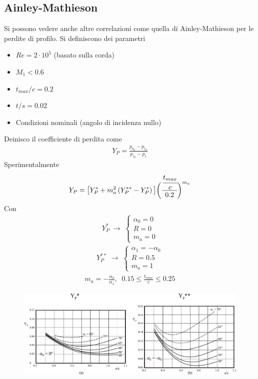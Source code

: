 \subsection{Ainley-Mathieson}
Si possono vedere anche altre correlazioni come quella di Ainley-Mathieson per le perdite di profilo. Si definiscono dei parametri
\begin{itemize}
\item $Re = 2 \cdot 10^5$ (basato sulla corda)
\item $M_1 < 0.6$
\item $t_{max}/c = 0.2$
\item $t/s = 0.02$
\item Condizioni nominali (angolo di incidenza nullo)
\end{itemize}
Deinisco il coefficiente di perdita come
\begin{align*}
Y_P = \frac{p_{0_0} - p_{1_0}}{p_{1_0} - p_1}
\end{align*}
Sperimentalmente
\begin{align*}
Y_P = \big[ Y_P^* + m_a^2 \left( Y_P^{**} - Y_P^* \right) \big] \bigg(\cfrac{\cfrac{t_{max}}{c}}{0.2} \bigg)^{m_a}
\end{align*}
Con 
\begin{align*}
Y_P^* \; \to \;
\begin{cases}
\alpha_0 = 0\\
R = 0\\
m_a = 0
\end{cases}
\end{align*}
\begin{align*}
Y_P^{**} \; \to \;
\begin{cases}
\alpha_1 = -\alpha_0\\
R = 0.5\\
m_a = 1
\end{cases}
\end{align*}
\begin{align*}
m_a = - \frac{\alpha_0}{\alpha_1}, \;\; 0.15 \leq \frac{t_{max}}{c} \leq 0.25
\end{align*}
\begin{figure}
\centering
  \includegraphics[width=\textwidth]{fig/Mathieson.pdf}
\caption{}
\label{fig:Mathieson}
\end{figure}
